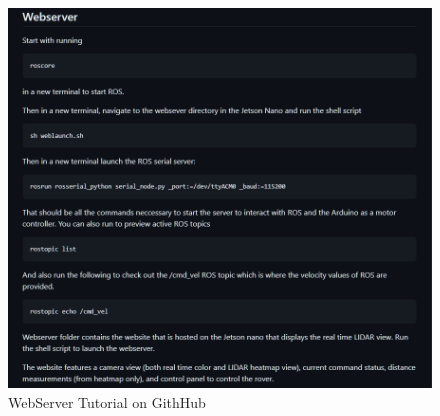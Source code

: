 \documentclass[a4paper, 10pt]{article}
\begin{document}
	\begin{figure} [!h]
			\centering
			\includegraphics[scale=0.5]{Photos/WebserverTut.png}
			\caption{WebServer Tutorial on GithHub}
			\label{webserver}
	\end{figure}
\end{document}
